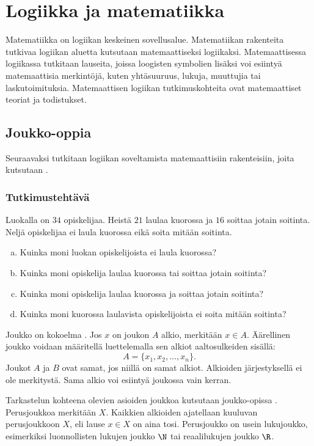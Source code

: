 \chapter{Logiikka ja matematiikka}

Matematiikka on logiikan keskeinen sovellusalue. Matematiikan rakenteita tutkivaa logiikan aluetta kutsutaan matemaattiseksi logiikaksi. Matemaattisessa logiikassa tutkitaan lauseita, joissa loogisten symbolien lisäksi voi esiintyä matemaattisia merkintöjä, kuten yhtäsuuruus, lukuja, muuttujia tai laskutoimituksia. Matemaattisen logiikan tutkimuskohteita ovat matemaattiset teoriat ja todistukset.


\section{Joukko-oppia}%
Seuraavaksi tutkitaan logiikan soveltamista matemaattisiin rakenteisiin, joita kutsutaan .

\subsection*{Tutkimustehtävä}
Luokalla on $34$ opiskelijaa. Heistä $21$ laulaa kuorossa ja $16$ soittaa jotain soitinta. Neljä opiskelijaa ei laula kuorossa eikä soita mitään soitinta.
\begin{enumerate}[a)]
\item Kuinka moni luokan opiskelijoista ei laula kuorossa?
\item Kuinka moni opiskelija laulaa kuorossa tai soittaa jotain soitinta?
\item Kuinka moni opiskelija laulaa kuorossa ja soittaa jotain soitinta?
\item Kuinka moni kuorossa laulavista opiskelijoista ei soita mitään soitinta?
\end{enumerate}

Joukko on kokoelma . Jos $x$ on joukon $A$ alkio, merkitään $x\in A$. Äärellinen joukko voidaan määritellä luettelemalla sen alkiot aaltosulkeiden sisällä:
\[
 A = \{ x_1,x_2,\ldots,x_n\}.
\]
Joukot $A$ ja $B$ ovat samat, jos niillä on samat alkiot. Alkioiden jär\-jes\-tyk\-sel\-lä ei ole merkitystä. Sama alkio voi esiintyä joukossa vain kerran.

Tarkastelun kohteena olevien asioiden joukkoa kutsutaan joukko-opissa . Perusjoukkoa merkitään $X$. Kaikkien alkioiden ajatellaan kuuluvan perusjoukkoon $X$, eli lause $x\in X$ on aina tosi. Perusjoukko on usein lukujoukko, esimerkiksi luonnollisten lukujen joukko $\N$ tai reaalilukujen joukko $\R$.

